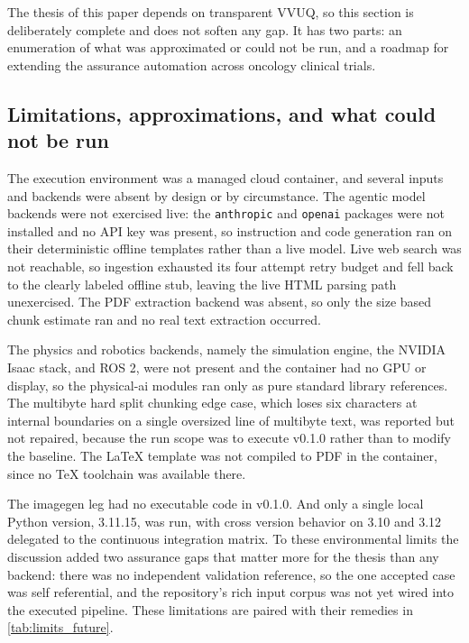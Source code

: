 
The thesis of this paper depends on transparent VVUQ, so this section is
deliberately complete and does not soften any gap. It has two parts: an enumeration of what was approximated or could not be run, and a roadmap for
extending the assurance automation across oncology clinical trials.

\subsection{Limitations, approximations, and what could not be run}

The execution environment was a managed cloud container, and several inputs and
backends were absent by design or by circumstance. The agentic model backends
were not exercised live: the \texttt{anthropic} and \texttt{openai} packages
were not installed and no API key was present, so instruction and code generation
ran on their deterministic offline templates rather than a live model. Live web
search was not reachable, so ingestion exhausted its four attempt retry budget
and fell back to the clearly labeled offline stub, leaving the live HTML parsing
path unexercised. The PDF extraction backend was absent, so only the size based
chunk estimate ran and no real text extraction occurred. 

The physics and robotics
backends, namely the simulation engine, the NVIDIA Isaac stack, and ROS 2, were
not present and the container had no GPU or display, so the physical-ai modules
ran only as pure standard library references. The multibyte hard split chunking
edge case, which loses six characters at internal boundaries on a single
oversized line of multibyte text, was reported but not repaired, because the run
scope was to execute v0.1.0 rather than to modify the baseline. The LaTeX
template was not compiled to PDF in the container, since no TeX toolchain was
available there. 

The imagegen leg had no executable code in v0.1.0. And only a
single local Python version, 3.11.15, was run, with cross version behavior on
3.10 and 3.12 delegated to the continuous integration matrix. To these
environmental limits the discussion added two assurance gaps that matter more for
the thesis than any backend: there was no independent validation reference, so
the one accepted case was self referential, and the repository's rich input
corpus was not yet wired into the executed pipeline. These limitations are paired
with their remedies in \autoref{tab:limits_future}.

